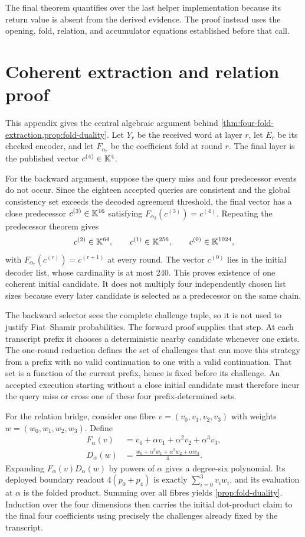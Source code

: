 The final theorem quantifies over the last helper implementation because its
return value is absent from the derived evidence.  The proof instead uses the
opening, fold, relation, and accumulator equations established before that
call.

\section{Coherent extraction and relation proof}
\label{app:coherent-extraction}

This appendix gives the central algebraic argument behind
\cref{thm:four-fold-extraction,prop:fold-duality}.  Let \(Y_r\) be the received
word at layer \(r\), let \(E_r\) be its checked encoder, and let
\(F_{\alpha_r}\) be the coefficient fold at round \(r\).  The final layer is
the published vector \(c^{(4)}\in\mathbb{K}^4\).

For the backward argument, suppose the query miss and four predecessor events
do not occur.  Since the eighteen accepted queries are consistent and the
global consistency set exceeds the decoded agreement threshold, the final
vector has a close predecessor \(c^{(3)}\in\mathbb{K}^{16}\) satisfying
\(F_{\alpha_3}(c^{(3)})=c^{(4)}\).  Repeating the predecessor theorem gives
\[
  c^{(2)}\in\mathbb{K}^{64},\qquad
  c^{(1)}\in\mathbb{K}^{256},\qquad
  c^{(0)}\in\mathbb{K}^{1024},
\]
with \(F_{\alpha_r}(c^{(r)})=c^{(r+1)}\) at every round.  The vector
\(c^{(0)}\) lies in the initial decoder list, whose cardinality is at most
240.  This proves existence of one coherent initial candidate.  It does not
multiply four independently chosen list sizes because every later candidate
is selected as a predecessor on the same chain.

The backward selector sees the complete challenge tuple, so it is not used to
justify Fiat--Shamir probabilities.  The forward proof supplies that step.
At each transcript prefix it chooses a deterministic nearby candidate whenever
one exists.  The one-round reduction defines the set of challenges that can
move this strategy from a prefix with no valid continuation to one with a
valid continuation.  That set is a function of the current prefix, hence is
fixed before its challenge.  An accepted execution starting without a close
initial candidate must therefore incur the query miss or cross one of these
four prefix-determined sets.

For the relation bridge, consider one fibre
\(v=(v_0,v_1,v_2,v_3)\) with weights
\(w=(w_0,w_1,w_2,w_3)\).  Define
\begin{align*}
  F_\alpha(v)
    &=v_0+\alpha v_1+\alpha^2v_2+\alpha^3v_3,\\
  D_\alpha(w)
    &=\frac{w_0+\alpha^3w_1+\alpha^2w_2+\alpha w_3}{4}.
\end{align*}
Expanding \(F_\alpha(v)D_\alpha(w)\) by powers of \(\alpha\) gives a
degree-six polynomial.  Its deployed boundary readout
\(4(p_0+p_4)\) is exactly \(\sum_{i=0}^3v_iw_i\), and its evaluation at
\(\alpha\) is the folded product.  Summing over all fibres yields
\cref{prop:fold-duality}.  Induction over the four dimensions then carries
the initial dot-product claim to the final four coefficients using precisely
the challenges already fixed by the transcript.

